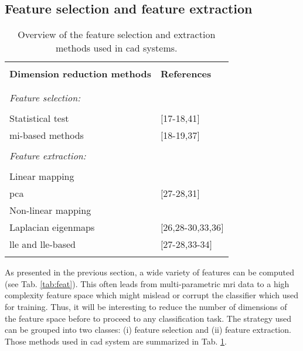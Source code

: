 \subsection{Feature selection and feature extraction} \label{subsec:featureselectionextraction}

\begin{table}
	\caption{Overview of the feature selection and extraction methods used in \ac{cad} systems.}
	\small
	\begin{tabular}{p{.65\linewidth} p{.25\linewidth}}
		\hline \\ [-1.5ex]
		\textbf{Dimension reduction methods} & \textbf{References} \\ \\ [-1.5ex]
		\hline \\ [-1.5ex]
		\textit{Feature selection:} & \\ \\ [-1.5ex]
		\quad Statistical test & $[$17-18,41$]$ \\
		\quad \ac{mi}-based methods & $[$18-19,37$]$ \\ \\ [-1.5ex]
		\textit{Feature extraction:} & \\ \\ [-1.5ex]
		\quad Linear mapping & \\
		\quad \quad \acs{pca} & $[$27-28,31$]$ \\
		\quad Non-linear mapping & \\
		\quad \quad Laplacian eigenmaps & $[$26,28-30,33,36$]$ \\
		\quad \quad \acs{lle} and \acs{lle}-based & $[$27-28,33-34$]$ \\ \\ [-1.5ex]
		\hline
	\end{tabular}
	\label{tab:featext}
\end{table}

As presented in the previous section, a wide variety of features can be computed (see Tab. \ref{tab:feat}). This often leads from multi-parametric \ac{mri} data to a high complexity feature space which might mislead or corrupt the classifier which used for training. Thus, it will be interesting to reduce the number of dimensions of the feature space before to proceed to any classification task. The strategy used can be grouped into two classes: (i) feature selection and (ii) feature extraction. Those methods used in \ac{cad} system are summarized in Tab. \ref{tab:featext}.

